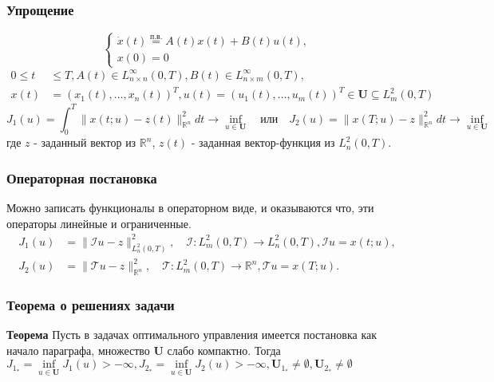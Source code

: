 \documentclass[A4]{article}
\begin{document}
\subsubsection{Упрощение}
\begin{equation*}
\left\{\begin{array}{l}
\dot{x}(t)\stackrel{\text{п.в.}}{=}A(t)x(t)+B(t)u(t),\\
x(0)=0
\end{array}\right.
\end{equation*}
\begin{equation*}
\begin{aligned}
0\leqslant t&\leqslant T,A(t)\in L^{\infty}_{n\times n}(0,T),B(t)\in L^{\infty}_{n\times m}(0,T),\\
x(t)&=(x_1(t),\ldots,x_n(t))^T,u(t)=(u_1(t),\ldots,u_m(t))^T\in\mathbf{U}\subseteq L^2_m(0,T)
\end{aligned}
\end{equation*}
\begin{equation*}
J_1(u)=\int_{0}^{T}\|x(t;u)-z(t)\|^2_{\mathbb{R}^n}dt\rightarrow\inf_{u\in\mathbf{U}} \quad\text{или}\quad J_2(u)=\|x(T;u)-z\|^2_{\mathbb{R}^n}dt\rightarrow\inf_{u\in\mathbf{U}}
\end{equation*}
где $z$ - заданный вектор из $\mathbb{R}^n$, $z(t)$ - заданная вектор-функция из $L^2_n(0,T)$.\\
\subsubsection{Операторная постановка}
Можно записать функционалы в операторном виде, и оказываются что, эти операторы линейные и ограниченные.
\begin{equation*}
\begin{aligned}
J_1(u)&=\|\mathcal{I}u-z\|^2_{L^2_n(0,T)},\quad\mathcal{I}:L^2_m(0,T)\rightarrow L^2_n(0,T), \mathcal{I}u=x(t;u),\\
J_2(u)&=\|\mathcal{T}u-z\|^2_{\mathbb{R}^n},\quad\mathcal{T}:L^2_m(0,T)\rightarrow\mathbb{R}^n,\mathcal{T}u=x(T;u).
\end{aligned}
\end{equation*}
\subsubsection{Теорема о решениях задачи}
\textbf{Теорема} Пусть в задачах оптимального управления имеется постановка как начало параграфа, множество $\mathbf{U}$ слабо компактно. Тогда $J_{1_*}=\inf\limits_{u\in\mathbf{U}}J_1(u)>-\infty,J_{2_*}=\inf\limits_{u\in\mathbf{U}}J_2(u)>-\infty,\mathbf{U}_{1_*}\ne\emptyset,\mathbf{U}_{2_*}\ne\emptyset$
\end{document}
